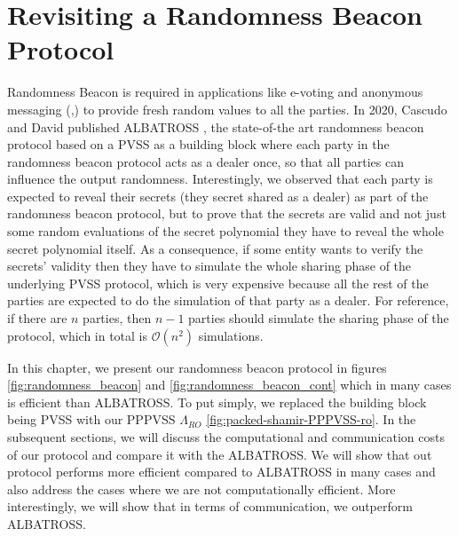 \chapter{Revisiting a Randomness Beacon Protocol}
\label{cha:n}

Randomness Beacon \cite{RABIN1983256} is required in applications like e-voting \cite{10.5555/1496711.1496734} 
and anonymous messaging (\cite{180263},\cite{10.1145/2815400.2815417}) to provide fresh random values to all the 
parties. In 2020, Cascudo and David published ALBATROSS \cite{cryptoeprint:2020/644}, the state-of-the art randomness 
beacon protocol based on a PVSS as a building block where each party in the randomness beacon protocol acts as a dealer once, so that all 
parties can influence the output randomness. Interestingly, we observed that each party is expected to reveal 
their secrets (they secret shared as a dealer) as part of the randomness beacon protocol, but to prove that the 
secrets are valid and not just some random evaluations of the secret polynomial they have to reveal the whole 
secret polynomial itself. As a consequence, if some entity wants to verify the secrets' validity then they have to 
simulate the whole sharing phase of the underlying PVSS protocol, which is very expensive because all the rest of the 
parties are expected to do the simulation of that party as a dealer. For reference, if there are $n$ parties, then 
$n-1$ parties should simulate the sharing phase of the protocol, which in total is $\mathcal{O}(n^2)$ simulations.\par

In this chapter, we present our randomness beacon protocol in figures \ref{fig:randomness_beacon} and \ref{fig:randomness_beacon_cont} 
which in many cases is efficient than ALBATROSS. To put simply, we replaced the building block being PVSS with 
our PPPVSS $\Lambda_{RO}$ \ref{fig:packed-shamir-PPPVSS-ro}. In the subsequent sections, we will discuss the 
computational and communication costs of our protocol and compare it with the ALBATROSS. We will show that out protocol 
performs more efficient compared to ALBATROSS in many cases and also address the cases where we are not computationally efficient.
More interestingly, we will show that in terms of communication, we outperform ALBATROSS.



